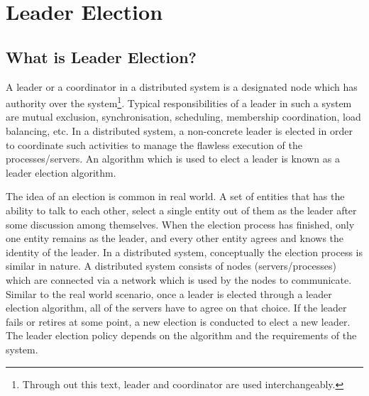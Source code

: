 \documentclass[dareport.tex]{subfiles}
\begin{document}
\section{Leader Election} \label{sec:election}
\subsection{What is Leader Election?}
A leader or a coordinator in a distributed system is a designated node which has authority over the system\footnote{Through out this text, leader and coordinator are used interchangeably.}. Typical responsibilities of a leader in such a system are mutual exclusion, synchronisation, scheduling, membership coordination, load balancing, etc. In a distributed system, a non-concrete leader is elected in order to coordinate such activities to manage the flawless execution of the processes/servers. An algorithm which is used to elect a leader is known as a leader election algorithm.

The idea of an election is common in real world. A set of entities that has the ability to talk to each other, select a single entity out of them as the leader after some discussion among themselves. When the election process has finished, only one entity remains as the leader, and every other entity agrees and knows the identity of the leader. In a distributed system, conceptually the election process is similar in nature. A distributed system consists of nodes (servers/processes) which are connected via a network which is used by the nodes to communicate. Similar to the real world scenario, once a leader is elected through a leader election algorithm, all of the servers have to agree on that choice. If the leader fails or retires at some point, a new election is conducted to elect a new leader. The leader election policy depends on the algorithm and the requirements of the system.
\end{document}
